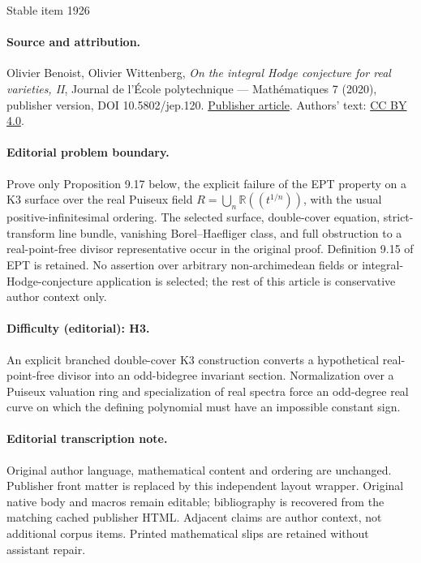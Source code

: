 \documentclass[11pt]{article}
\begin{document}
\begin{center}{\Large Stable item 1926}\end{center}
\paragraph{Source and attribution.}
Olivier Benoist, Olivier Wittenberg, \emph{On the integral Hodge conjecture for real varieties, II}, Journal de l’École polytechnique — Mathématiques 7 (2020), publisher version, DOI 10.5802/jep.120. \href{https://jep.centre-mersenne.org/articles/10.5802/jep.120/}{Publisher article}. Authors' text: \href{https://creativecommons.org/licenses/by/4.0/}{CC BY 4.0}.
\paragraph{Editorial problem boundary.}
Prove only Proposition 9.17 below, the explicit failure of the EPT property on a K3 surface over the real Puiseux field \(R=\bigcup_n\mathbb R((t^{1/n}))\), with the usual positive-infinitesimal ordering. The selected surface, double-cover equation, strict-transform line bundle, vanishing Borel--Haefliger class, and full obstruction to a real-point-free divisor representative occur in the original proof. Definition 9.15 of EPT is retained. No assertion over arbitrary non-archimedean fields or integral-Hodge-conjecture application is selected; the rest of this article is conservative author context only.
\paragraph{Difficulty (editorial): H3.}
An explicit branched double-cover K3 construction converts a hypothetical real-point-free divisor into an odd-bidegree invariant section. Normalization over a Puiseux valuation ring and specialization of real spectra force an odd-degree real curve on which the defining polynomial must have an impossible constant sign.
\paragraph{Editorial transcription note.}
Original author language, mathematical content and ordering are unchanged. Publisher front matter is replaced by this independent layout wrapper. Original native body and macros remain editable; bibliography is recovered from the matching cached publisher HTML. Adjacent claims are author context, not additional corpus items. Printed mathematical slips are retained without assistant repair.
\clearpage
\end{document}

